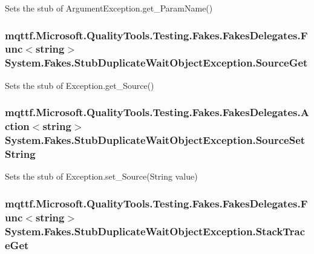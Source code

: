 Sets the stub of Argument\-Exception.\-get\-\_\-\-Param\-Name()

\hypertarget{class_system_1_1_fakes_1_1_stub_duplicate_wait_object_exception_a7ceacf4b948f48fa46929a1f79c6a045}{
\subsubsection[{Source\-Get}]{\setlength{\rightskip}{0pt plus 5cm}mqttf.\-Microsoft.\-Quality\-Tools.\-Testing.\-Fakes.\-Fakes\-Delegates.\-Func$<$string$>$ System.\-Fakes.\-Stub\-Duplicate\-Wait\-Object\-Exception.\-Source\-Get}}\label{class_system_1_1_fakes_1_1_stub_duplicate_wait_object_exception_a7ceacf4b948f48fa46929a1f79c6a045}


Sets the stub of Exception.\-get\-\_\-\-Source()

\hypertarget{class_system_1_1_fakes_1_1_stub_duplicate_wait_object_exception_adc672186089395e9e3461568af156d7e}{
\subsubsection[{Source\-Set\-String}]{\setlength{\rightskip}{0pt plus 5cm}mqttf.\-Microsoft.\-Quality\-Tools.\-Testing.\-Fakes.\-Fakes\-Delegates.\-Action$<$string$>$ System.\-Fakes.\-Stub\-Duplicate\-Wait\-Object\-Exception.\-Source\-Set\-String}}\label{class_system_1_1_fakes_1_1_stub_duplicate_wait_object_exception_adc672186089395e9e3461568af156d7e}


Sets the stub of Exception.\-set\-\_\-\-Source(\-String value)

\hypertarget{class_system_1_1_fakes_1_1_stub_duplicate_wait_object_exception_ac9b7a9c8f2a675b2e018547a6f002557}{
\subsubsection[{Stack\-Trace\-Get}]{\setlength{\rightskip}{0pt plus 5cm}mqttf.\-Microsoft.\-Quality\-Tools.\-Testing.\-Fakes.\-Fakes\-Delegates.\-Func$<$string$>$ System.\-Fakes.\-Stub\-Duplicate\-Wait\-Object\-Exception.\-Stack\-Trace\-Get}}\label{class_system_1_1_fakes_1_1_stub_duplicate_wait_object_exception_ac9b7a9c8f2a675b2e018547a6f002557}


